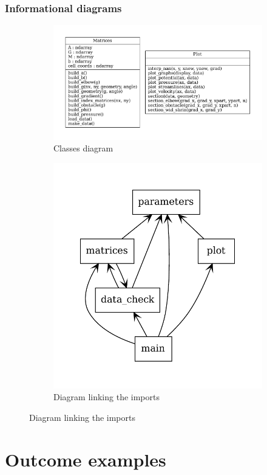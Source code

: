 \section{Informational diagrams}
\begin{figure}[htbp]
      \centering
      \begin{subfigure}{.7\textwidth}
            \centering
            \includegraphics[width=.8\linewidth]{beta/classes_all.pdf}
            \caption{Classes diagram}
      \end{subfigure}

      \begin{subfigure}{.7\textwidth}
            \centering
            \includegraphics[width=.8\linewidth]{beta/packages_all.pdf}
            \caption{Diagram linking the imports}
      \end{subfigure}
\end{figure}
\newpage
\part{Outcome examples}
